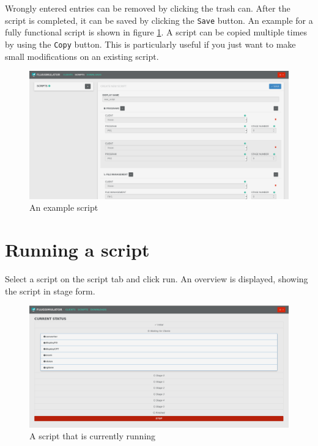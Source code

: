 \documentclass[accentcolor=tud1a, paper=a4, colorback]{tudreport}
\begin{document}
	\\\\
	Wrongly entered entries can be removed by clicking the trash can. After the script is completed,
	it can be saved by clicking the \texttt{Save} button. An example for a fully functional script
	is shown in figure \ref{example_script}. A script can be copied multiple times by using
	the \texttt{Copy} button. This is particularly useful if you just want to make small modifications
	on an existing script.
	\begin{figure}[H]
		\centering
		\includegraphics[width=.9\textwidth]{example_script}
		\caption{An example script}
		\label{example_script}
	\end{figure}

	\section{Running a script}
	Select a script on the script tab and click run. An overview is displayed, showing
	the script in stage form.
	\begin{figure}[H]
		\centering
		\includegraphics[width=.9\textwidth]{running_script}
		\caption{A script that is currently running}
		\label{running_script}
	\end{figure}
\end{document}
